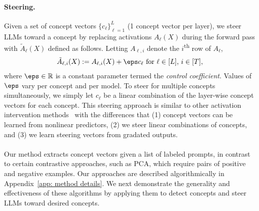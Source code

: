 \paragraph{Steering.}  Given a set of concept vectors $\{c_{\ell}\}_{\ell=1 }^{L}$ (1 concept vector per layer), we steer LLMs toward a concept by replacing activations $A_{\ell}(X)$ during the forward pass with $\tilde{A}_{\ell}(X)$ defined as follows.  Letting $A_{\ell, i}$ denote the $i$\textsuperscript{th} row of $A_{\ell}$, 
\begin{align}
    \tilde{A}_{\ell, i}(X) := A_{\ell, i}(X) + \eps c_{\ell}  ~ \text{for $\ell \in [L]$, $i \in [T]$},
\end{align} 
where $\eps \in \mathbb{R}$ is a constant parameter termed the \textit{control coefficient}. Values of $\eps$ vary per concept and per model. To steer for multiple concepts simultaneously, we simply let $c_{\ell}$ be a linear combination of the layer-wise concept vectors for each concept.  This steering approach is similar to other activation intervention methods~\citep{turner2023activation, representation_engineering, refusal_mediated, panickssery2023steering} with the differences that (1) concept vectors can be learned from nonlinear predictors, (2) we steer linear combinations of concepts, and (3) we learn steering vectors from gradated outputs. 
\\
\\
\noindent Our method extracts concept vectors given a list of labeled prompts, in contrast to certain contrastive approaches, such as PCA, which require pairs of positive and negative examples. Our approaches are described algorithmically in Appendix~\ref{app: method details}. We next demonstrate the generality and effectiveness of these algorithms by applying them to detect concepts and steer LLMs toward desired concepts.